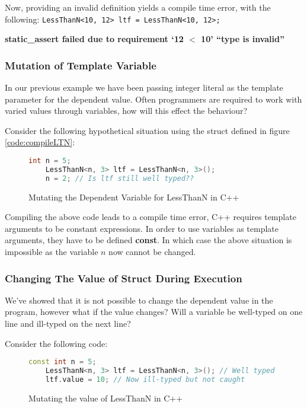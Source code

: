 \documentclass[a4paper,12pt]{report}
\begin{document}
\par
Now, providing an invalid definition yields a compile time error, with the 
following: 
\verb+LessThanN<10, 12> ltf = LessThanN<10, 12>;+ 

\textbf{static\_assert failed due to requirement `12 $<$ 10' ``type is invalid''}

\subsubsection{Mutation of Template Variable}
In our previous example we have been passing integer literal as the template 
parameter for the dependent value. Often programmers are required to 
work with varied values through variables, how will this effect the behaviour? 

\par
Consider the following hypothetical situation using the struct defined in 
figure \ref{code:compileLTN}: 

\begin{figure}[H]
  \begin{lstlisting}[language=c++]     
    int n = 5;
    LessThanN<n, 3> ltf = LessThanN<n, 3>();
    n = 2; // Is ltf still well typed??
  \end{lstlisting}
  \caption{Mutating the Dependent Variable for LessThanN in C++}
\end{figure}

\par
Compiling the above code leads to a compile time error, C++ requires template 
arguments to be constant expressions. In order to use variables as template 
arguments, they have to be defined \textbf{const}. In which case the above 
situation is impossible as the variable $n$ now cannot be changed. 

\subsubsection{Changing The Value of Struct During Execution}
We've showed that it is not possible to change the dependent value in 
the program, however what if the value changes? Will a 
variable be well-typed on one line and ill-typed on the next line? 

\par
Consider the following code: 
\begin{figure}[H]
  \begin{lstlisting}[language=c++]     
    const int n = 5;
    LessThanN<n, 3> ltf = LessThanN<n, 3>(); // Well typed
    ltf.value = 10; // Now ill-typed but not caught
  \end{lstlisting}
  \caption{Mutating the value of LessThanN in C++}
\end{figure}
\end{document}
